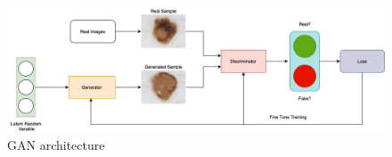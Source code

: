\begin{figure}
    \centerline{\includegraphics[width=1\columnwidth]{02-related-works/figures/gan-architecture.png}}
    \caption{ GAN architecture }
    \label{figure:gan-architecture}
\end{figure}